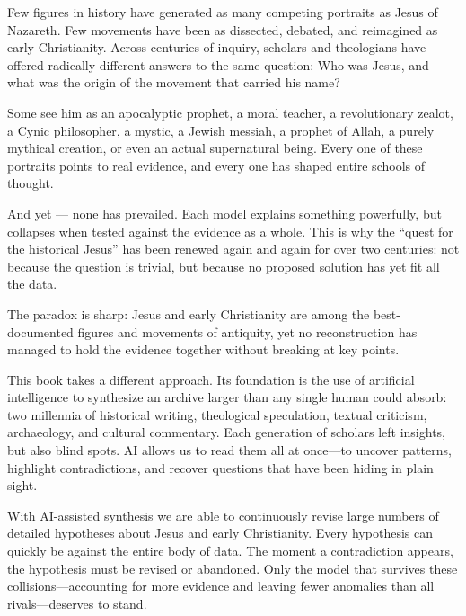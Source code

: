 Few figures in history have generated as many competing portraits as Jesus of Nazareth.
Few movements have been as dissected, debated, and reimagined as early Christianity.
Across centuries of inquiry, scholars and theologians have offered radically different answers to the same question: Who was Jesus, and what was the origin of the movement that carried his name?

Some see him as an apocalyptic prophet, a moral teacher, a revolutionary zealot, a Cynic philosopher, a mystic, a Jewish messiah, a prophet of Allah, a purely mythical creation, or even an actual supernatural being.
Every one of these portraits points to real evidence, and every one has shaped entire schools of thought.

And yet — none has prevailed.
Each model explains something powerfully, but collapses when tested against the evidence as a whole.
This is why the “quest for the historical Jesus” has been renewed again and again for over two centuries: not because the question is trivial, but because no proposed solution has yet fit all the data.

The paradox is sharp: Jesus and early Christianity are among the best-documented figures and movements of antiquity, yet no reconstruction has managed to hold the evidence together without breaking at key points.

This book takes a different approach.
Its foundation is the use of artificial intelligence to synthesize an archive larger than any single human could absorb: two millennia of historical writing, theological speculation, textual criticism, archaeology, and cultural commentary.
Each generation of scholars left insights, but also blind spots.
AI allows us to read them all at once—to uncover patterns, highlight contradictions, and recover questions that have been hiding in plain sight.

With AI-assisted synthesis we are able to continuously revise large numbers of detailed hypotheses about Jesus and early Christianity.
Every hypothesis can quickly be against the entire body of data.
The moment a contradiction appears, the hypothesis must be revised or abandoned.
Only the model that survives these collisions—accounting for more evidence and leaving fewer anomalies than all rivals—deserves to stand.

